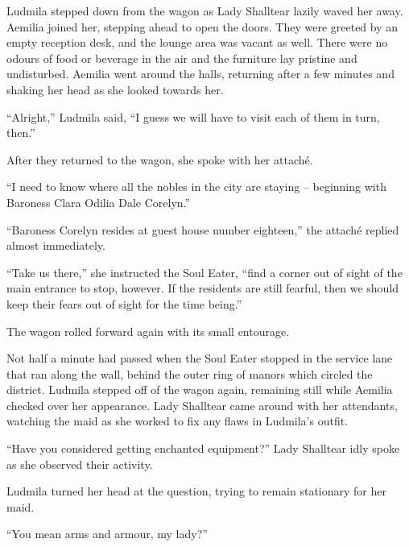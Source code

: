  

Ludmila stepped down from the wagon as Lady Shalltear lazily waved her away. Aemilia joined her, stepping ahead to open the doors. They were greeted by an empty reception desk, and the lounge area was vacant as well. There were no odours of food or beverage in the air and the furniture lay pristine and undisturbed. Aemilia went around the halls, returning after a few minutes and shaking her head as she looked towards her.

 

“Alright,” Ludmila said, “I guess we will have to visit each of them in turn, then.”

 

After they returned to the wagon, she spoke with her attaché.

 

“I need to know where all the nobles in the city are staying – beginning with Baroness Clara Odilia Dale Corelyn.”

 

“Baroness Corelyn resides at guest house number eighteen,” the attaché replied almost immediately.

 

“Take us there,” she instructed the Soul Eater, “find a corner out of sight of the main entrance to stop, however. If the residents are still fearful, then we should keep their fears out of sight for the time being.”

 

The wagon rolled forward again with its small entourage.

 

Not half a minute had passed when the Soul Eater stopped in the service lane that ran along the wall, behind the outer ring of manors which circled the district. Ludmila stepped off of the wagon again, remaining still while Aemilia checked over her appearance. Lady Shalltear came around with her attendants, watching the maid as she worked to fix any flaws in Ludmila’s outfit.

 

“Have you considered getting enchanted equipment?” Lady Shalltear idly spoke as she observed their activity.

 

Ludmila turned her head at the question, trying to remain stationary for her maid.

 

“You mean arms and armour, my lady?”

 

